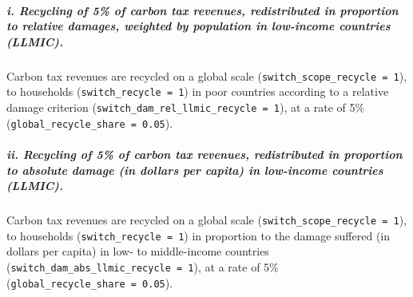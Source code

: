 \documentclass[
]{article}
\begin{document}
\subparagraph{i. Recycling of 5\% of carbon tax revenues, redistributed
in proportion to relative damages, weighted by population in low-income
countries
(LLMIC).}\label{i.-recycling-of-5-of-carbon-tax-revenues-redistributed-in-proportion-to-relative-damages-weighted-by-population-in-low-income-countries-llmic.}

Carbon tax revenues are recycled on a global scale
(\texttt{switch\_scope\_recycle\ =\ 1}), to households
(\texttt{switch\_recycle\ =\ 1}) in poor countries according to a
relative damage criterion
(\texttt{switch\_dam\_rel\_llmic\_recycle\ =\ 1}), at a rate of 5\%
(\texttt{global\_recycle\_share\ =\ 0.05}).

\subparagraph{ii. Recycling of 5\% of carbon tax revenues,
redistributed in proportion to absolute damage (in dollars per capita)
in low-income countries
(LLMIC).}\label{ii.-recycling-of-5-of-carbon-tax-revenues-redistributed-in-proportion-to-absolute-damage-in-dollars-per-capita-in-low-income-countries-llmic.}

Carbon tax revenues are recycled on a global scale
(\texttt{switch\_scope\_recycle\ =\ 1}), to households
(\texttt{switch\_recycle\ =\ 1}) in proportion to the damage suffered
(in dollars per capita) in low- to middle-income countries
(\texttt{switch\_dam\_abs\_llmic\_recycle\ =\ 1}), at a rate of 5\%
(\texttt{global\_recycle\_share\ =\ 0.05}).
\end{document}
